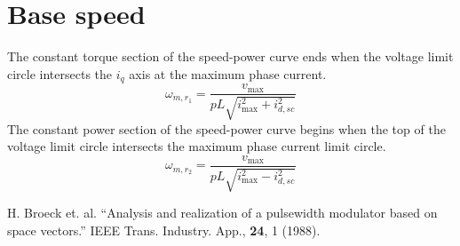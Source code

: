 \documentclass[11pt]{amsart}
\begin{document}
\section{Base speed}

The constant torque section of the speed-power curve ends when the
voltage limit circle intersects the $i_q$ axis at the maximum phase
current.
%
\begin{equation}
  \omega_{m, r_1} = \frac{v_{\max}}{p L \sqrt{i_{\max}^2 + i_{d,sc}^2}}
\end{equation}
%
The constant power section of the speed-power curve begins when the
top of the voltage limit circle intersects the maximum phase current
limit circle.
%
\begin{equation}
  \omega_{m, r_2} = \frac{v_{\max}}{p L \sqrt{i_{\max}^2 - i_{d,sc}^2}}
\end{equation}

\begin{thebibliography}{1}
 H. Broeck et. al. ``Analysis and realization of a
  pulsewidth modulator based on space vectors.'' IEEE
  Trans. Industry. App., \textbf{24}, 1 (1988).
\end{thebibliography}
\end{document}
